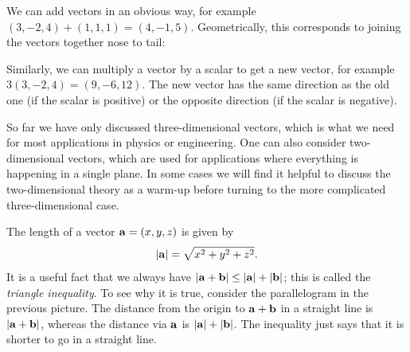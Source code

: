 \documentclass[reqno]{amsart}
\theoremstyle{definition}
\begin{document}
We can add vectors in an obvious way, for example
$(3,-2,4)+(1,1,1)=(4,-1,5)$.  Geometrically, this corresponds to
joining the vectors together nose to tail:
\begin{center}
\end{center}
Similarly, we can multiply a vector by a scalar to get a new vector,
for example $3(3,-2,4)=(9,-6,12)$.  The new vector has the same
direction as the old one (if the scalar is positive) or the opposite
direction (if the scalar is negative).

So far we have only discussed three-dimensional vectors, which is what
we need for most applications in physics or engineering.  One can also
consider two-dimensional vectors, which are used for applications
where everything is happening in a single plane.  In some cases we
will find it helpful to discuss the two-dimensional theory as a
warm-up before turning to the more complicated three-dimensional
case.  

The length of a vector $\mathbf{a}=(x,y,z)$ is given by
\[ |\mathbf{a}| = \sqrt{x^2+y^2+z^2}. \]
It is a useful fact that we always have $|\mathbf{a}+\mathbf{b}|\leq|\mathbf{a}|+|\mathbf{b}|$;
this is called the \emph{triangle inequality}.  To see why it is true,
consider the parallelogram in the previous picture.  The distance from
the origin to $\mathbf{a}+\mathbf{b}$ in a straight line is $|\mathbf{a}+\mathbf{b}|$, whereas the
distance via $\mathbf{a}$ is $|\mathbf{a}|+|\mathbf{b}|$.  The inequality just says that it
is shorter to go in a straight line.
\end{document}
